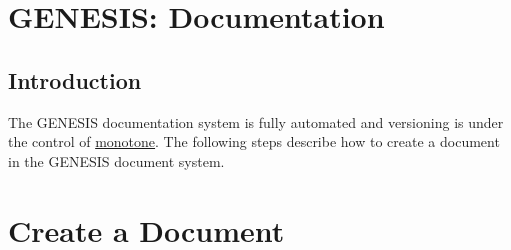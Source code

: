 \documentclass[12pt]{article}
\begin{document}
\section*{GENESIS: Documentation}

\subsection*{Introduction}

The GENESIS documentation system is fully automated and versioning is under the control of \href{http://monotone.ca/}{monotone}.
The following steps describe how to create a document in the GENESIS document system. 

\section*{Create a Document}
\end{document}
